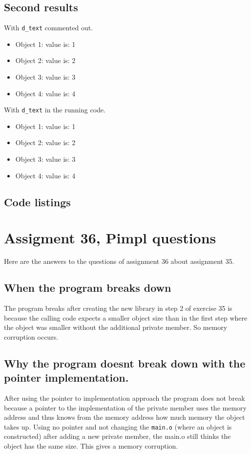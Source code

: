 \documentclass[11pt]{article}
\begin{document}
\subsection*{Second results}
With \texttt{d\_text} commented out.
\begin{itemize}
\item Object 1: value is: 1
\item Object 2: value is: 2
\item Object 3: value is: 3
\item Object 4: value is: 4
\end{itemize}

With \texttt{d\_text} in the running code.
\begin{itemize}
\item Object 1: value is: 1
\item Object 2: value is: 2
\item Object 3: value is: 3
\item Object 4: value is: 4
\end{itemize}

\subsection*{Code listings}






\section*{Assigment 36, Pimpl questions}
Here are the answers to the questions of assignment 36 about assignment 35.

\subsection*{When the program breaks down}
The program breaks after creating the new library in step 2 of exercise 35 is because the calling code expects a smaller object  size than in the first step where the object was smaller without the additional private member. So memory corruption occurs.

\subsection*{Why the program doesnt break down with the pointer implementation.}
After using the pointer to implementation approach the program does not break because a pointer to the implementation of the private member uses the memory address and thus knows from the memory address how much memory the object takes up. Using no pointer and not changing the \texttt{main.o} (where an object is constructed) after adding a new private member, the main.o still thinks the object has the same size. This gives a memory corruption.
\end{document}
